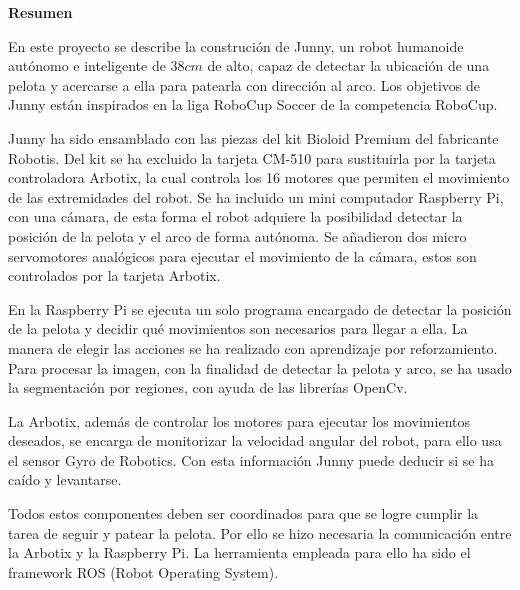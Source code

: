 \setcounter{page}{4}
\begin{center}
	{\bf Resumen}  %
\end{center}	


En este proyecto se describe la construción de Junny, un robot humanoide autónomo e inteligente de $38 cm $ de alto, capaz de detectar la ubicación de una pelota y acercarse a ella para patearla con dirección al arco. Los objetivos de Junny están inspirados en la liga RoboCup Soccer de la competencia RoboCup.

Junny ha sido ensamblado con las piezas del kit Bioloid Premium del fabricante Robotis. Del kit se ha excluido la tarjeta CM-510 para sustituirla por la tarjeta controladora Arbotix, la cual controla los 16 motores que permiten el movimiento de las extremidades del robot. Se ha incluido un mini computador Raspberry Pi, con una cámara, %
de esta forma el robot adquiere la posibilidad detectar la posición de la pelota y el arco de forma autónoma. Se añadieron dos micro servomotores analógicos para ejecutar el movimiento de la c\'amara, estos son controlados por la tarjeta Arbotix. 

En la Raspberry Pi se ejecuta un solo programa encargado de detectar la posición de la pelota y decidir qué movimientos son necesarios para llegar a ella. La manera de elegir las acciones se ha realizado con aprendizaje por reforzamiento. Para procesar la imagen, con la finalidad de detectar la pelota y arco, se ha usado la segmentaci\'on por regiones, con ayuda de las librerías OpenCv. %

La Arbotix, además de controlar los motores para ejecutar los movimientos deseados, se encarga de monitorizar la velocidad angular del robot, para ello usa el sensor Gyro de Robotics. Con esta información Junny puede deducir si se ha caído y levantarse. 

Todos estos componentes deben ser coordinados para que se logre cumplir la tarea de seguir y patear la pelota. Por ello se hizo necesaria la comunicación entre la Arbotix y la Raspberry Pi. La herramienta 
empleada para ello ha sido el \gls{framework} \gls{ROS} (Robot Operating System). %

